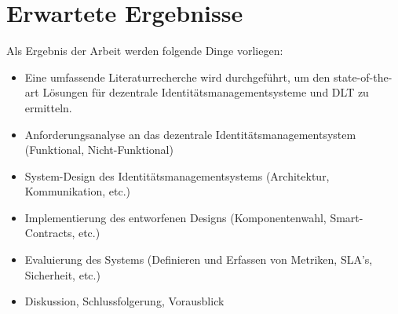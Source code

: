 \chapter{Erwartete Ergebnisse}
\label{cha:beispiele}

Als Ergebnis der Arbeit werden folgende Dinge vorliegen:
\begin{itemize}
	\item Eine umfassende Literaturrecherche wird durchgeführt, um den state-of-the-art Lösungen für dezentrale Identitätsmanagementsysteme und DLT zu ermitteln.
	\item Anforderungsanalyse an das dezentrale Identitätsmanagementsystem (Funktional, Nicht-Funktional)
	\item System-Design des Identitätsmanagementsystems (Architektur, Kommunikation, etc.)
	\item Implementierung des entworfenen Designs (Komponentenwahl, Smart-Contracts, etc.)
	\item Evaluierung des Systems (Definieren und Erfassen von Metriken, SLA’s, Sicherheit, etc.)
	\item Diskussion, Schlussfolgerung, Vorausblick
\end{itemize}